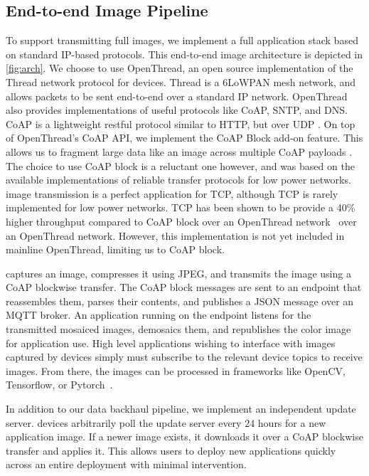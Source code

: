 \subsection{End-to-end Image Pipeline}
To support transmitting full images, we implement a full application stack based on standard IP-based protocols. This end-to-end image architecture is depicted in \cref{fig:arch}.
We choose to use OpenThread, an open source implementation of the Thread network protocol for \name devices. Thread is a 6LoWPAN mesh network, and allows packets to be sent end-to-end over a standard IP network. OpenThread also provides implementations of useful protocols like CoAP, SNTP, and DNS. 
CoAP is a lightweight restful protocol similar to HTTP, but over UDP \cite{shelby2014constrained}. 
On top of OpenThread's CoAP API, we implement the CoAP Block add-on feature. This allows us to fragment large data like an image across multiple CoAP payloads \cite{bormann2016block}. 
The choice to use CoAP block is a reluctant one however, and was based on the available implementations of reliable transfer protocols for low power networks.
\name image transmission is a perfect application for TCP, although TCP is rarely implemented for low power networks. TCP has been shown to be provide a 40\% higher throughput compared to CoAP block over an OpenThread network~\cite{kumar2020performant} over an OpenThread network. However, this implementation is not yet included in mainline OpenThread, limiting us to CoAP block.

\name captures an image, compresses it using JPEG, and transmits the image using a CoAP blockwise transfer. The CoAP block messages are sent to an endpoint that reassembles them, parses their contents, and publishes a JSON message over an MQTT broker. An application running on the endpoint listens for the transmitted mosaiced images, demosaics them, and republishes the color image for application use. High level applications wishing to interface with images captured by \name devices simply must subscribe to the relevant device topics to receive images. From there, the images can be processed in frameworks like OpenCV, Tensorflow, or Pytorch~\cite{tensorflow2015-whitepaper, pytorch,itseez2015opencv}.

In addition to our data backhaul pipeline, we implement an independent update server. \name devices arbitrarily poll the update server every 24 hours for a new application image. If a newer image exists, it downloads it over a CoAP blockwise transfer and applies it. This allows users to deploy new applications quickly across an entire deployment with minimal intervention.

